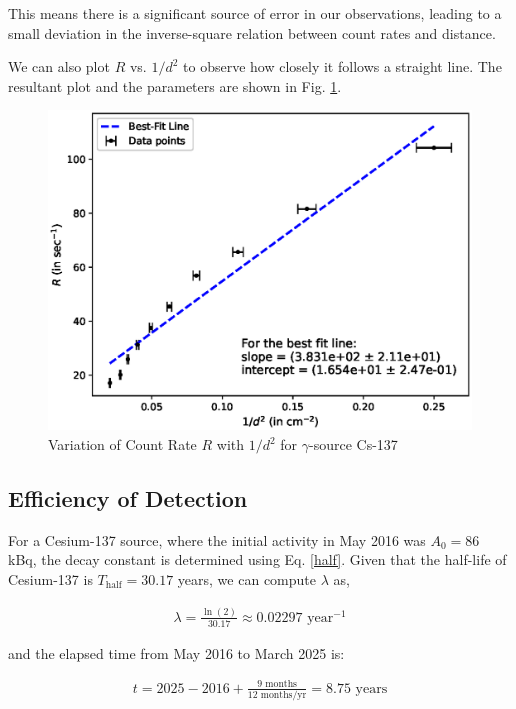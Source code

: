 This means there is a significant source of error in our observations, leading to a small deviation in the inverse-square relation between count rates and distance.

We can also plot $R$ vs. $1/d^2$ to observe how closely it follows a straight line. The resultant plot and the parameters are shown in Fig. \ref{g5}. 
\begin{figure}
    \centering
    \includegraphics[width=1\columnwidth]{images/inv3.eps}
    \caption{Variation of Count Rate $R$ with $1/d^2$ for $\gamma$-source Cs-137}
    \label{g5}
\end{figure}

\subsection{Efficiency of Detection}
For a Cesium-137 source, where the initial activity in May 2016 was $A_0 = 86$ kBq, the decay constant is determined using Eq. \ref{half}.
Given that the half-life of Cesium-137 is $T_\text{half} = 30.17$ years, we can compute $\lambda$ as,

\begin{align*}
    \lambda = \frac{\ln(2)}{30.17} \approx 0.02297 \text{ year}^{-1}
\end{align*}

and the elapsed time from May 2016 to March 2025 is:

\begin{align*}
    t = 2025 - 2016 + \frac{9 \text{ months}}{12 \text{ months/yr}} = 8.75 \text{ years}
\end{align*}

